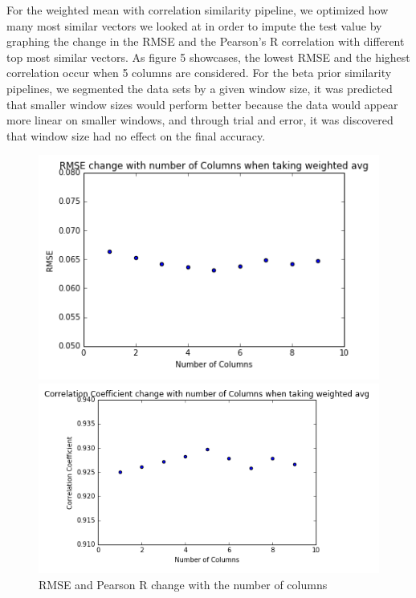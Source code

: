 \documentclass{article} %
\begin{document}
For the weighted mean with correlation similarity pipeline, we optimized how many most similar vectors we looked at in order to impute the test value by graphing the change in the RMSE and the Pearson's R correlation with different top most similar vectors. As figure 5 showcases, the lowest RMSE and the highest correlation occur when 5 columns are considered. For the beta prior similarity pipelines, we segmented the data sets by a given window size, it was predicted that smaller window sizes would perform better because the data would appear more linear on smaller windows, and through trial and error, it was discovered that window size had no effect on the final accuracy.

\begin{figure}[!ht]
\begin{center}
\caption{RMSE and Pearson R change with the number of columns}
\begin{minipage}[b]{0.40\linewidth}
	\includegraphics[scale=0.3]{RMSEWeightedMeanOpt.png}
\end{minipage}
\quad
\begin{minipage}[b]{0.40\linewidth}
	\includegraphics[scale=0.3]{CorrelationWeightedMeanOpt.png}
\end{minipage}
\end{center}
\end{figure}
\end{document}
